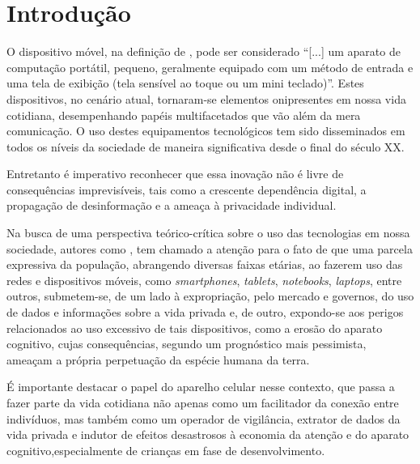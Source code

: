\documentclass[portuguese]{textolivre}
\begin{document}
\begin{polyabstract}
\begin{english}
\begin{abstract}
\end{abstract}
\end{english}
\end{polyabstract}

\section{Introdução}
O dispositivo móvel, na definição de \textcite[p. 10]{canto_dispositivos_2018}, pode ser considerado “[...] um aparato de computação portátil, pequeno, geralmente equipado com um método de entrada e uma tela de exibição (tela sensível ao toque ou um mini teclado)”. Estes dispositivos, no cenário atual, tornaram-se elementos onipresentes em nossa vida cotidiana, desempenhando papéis multifacetados que vão além da mera comunicação. O uso destes equipamentos tecnológicos tem sido disseminados em todos os níveis da sociedade de maneira significativa desde o final do século XX.

Entretanto é imperativo reconhecer que essa inovação não é livre de consequências imprevisíveis, tais como a crescente dependência digital, a propagação de desinformação e a ameaça à privacidade individual.

Na busca de uma perspectiva teórico-crítica sobre o uso das tecnologias em nossa sociedade, autores como \textcite{assange_2013-1,desmurget_fabrica_2021}, tem chamado a atenção para o fato de que uma parcela expressiva da população, abrangendo diversas faixas etárias, ao fazerem uso das redes e dispositivos móveis, como \textit{smartphones}, \textit{tablets}, \textit{notebooks}, \textit{laptops}, entre outros, submetem-se, de um lado à expropriação, pelo mercado e governos, do uso de dados e informações sobre a vida privada e, de outro, expondo-se aos perigos relacionados ao uso excessivo de tais dispositivos, como a erosão do aparato cognitivo, cujas consequências, segundo um prognóstico mais pessimista, ameaçam a própria perpetuação da espécie humana da terra.

É importante destacar o papel do aparelho celular nesse contexto, que passa a fazer parte da
vida cotidiana não apenas como um facilitador da conexão entre indivíduos, mas também como um operador de vigilância, extrator de dados da vida privada  e indutor de efeitos desastrosos à economia da atenção e do aparato cognitivo,especialmente de crianças em fase de desenvolvimento.
\end{document}
